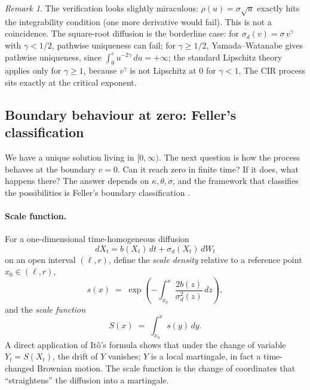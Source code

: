 \documentclass[11pt]{article}
\theoremstyle{plain}
\theoremstyle{definition}
\theoremstyle{remark}
\newtheorem{remark}[theorem]{Remark}
\begin{document}
\begin{remark}
    The verification looks slightly miraculous: \(\rho(u) = \sigma\sqrt{u}\) exactly hits the integrability condition (one more derivative would fail). This is not a coincidence. The square-root diffusion is the borderline case: for \(\sigma_d(v) = \sigma\,v^\gamma\) with \(\gamma < 1/2\), pathwise uniqueness can fail; for \(\gamma \geq 1/2\), Yamada--Watanabe gives pathwise uniqueness, since \(\int_0^\varepsilon u^{-2\gamma}\,du = +\infty\); the standard Lipschitz theory applies only for \(\gamma \geq 1\), because \(v^\gamma\) is not Lipschitz at \(0\) for \(\gamma < 1\). The CIR process sits exactly at the critical exponent.
\end{remark}

\subsection{Boundary behaviour at zero: Feller's classification}
\label{sec:cir-boundary}

We have a unique solution living in \([0, \infty)\). The next question is how the process behaves at the boundary \(v = 0\). Can it reach zero in finite time? If it does, what happens there? The answer depends on \(\kappa, \theta, \sigma\), and the framework that classifies the possibilities is Feller's boundary classification \cite{Feller1951}.

\paragraph{Scale function.}
For a one-dimensional time-homogeneous diffusion
\[
    dX_t = b(X_t)\,dt + \sigma_d(X_t)\,dW_t
\]
on an open interval \((\ell, r)\), define the \emph{scale density} relative to a reference point \(x_0 \in (\ell, r)\),
\[
    s(x) \;=\; \exp\!\left(-\int_{x_0}^{x} \frac{2 b(z)}{\sigma_d^2(z)}\,dz\right),
\]
and the \emph{scale function}
\[
    S(x) \;=\; \int_{x_0}^{x} s(y)\,dy.
\]
A direct application of Itô's formula shows that under the change of variable \(Y_t = S(X_t)\), the drift of \(Y\) vanishes; \(Y\) is a local martingale, in fact a time-changed Brownian motion. The scale function is the change of coordinates that ``straightens'' the diffusion into a martingale.
\end{document}
